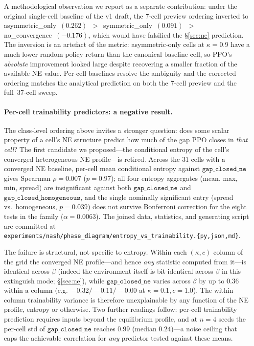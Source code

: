 \documentclass{anvil-paper}
\begin{document}
A methodological observation we report as a separate contribution:
under the original single-cell baseline of the v1 draft, the 7-cell
preview ordering inverted to
\textsf{asymmetric\_only}~$(0.262)$~$>$~\textsf{symmetric\_only}~$(0.091)$~$>$~%
\textsf{no\_convergence}~$(-0.176)$, which would have falsified the
\S\ref{sec:ne} prediction. The inversion is an artefact of the metric:
asymmetric-only cells at $\kappa{=}0.9$ have a much lower random-policy
return than the canonical baseline cell, so PPO's \emph{absolute}
improvement looked large despite recovering a smaller fraction of the
available NE value. Per-cell baselines resolve the ambiguity and the
corrected ordering matches the analytical prediction on both the 7-cell
preview and the full~$37$-cell sweep.

\paragraph{Per-cell trainability predictors: a negative result.}
The class-level ordering above invites a stronger question: does some
scalar property of a cell's NE structure predict how much of the gap PPO
closes in \emph{that cell}? The first candidate we proposed---the
conditional entropy of the cell's converged heterogeneous NE
profile---is retired. Across the $31$ cells with a converged NE
baseline, per-cell mean conditional entropy against
$\texttt{gap\_closed\_ne}$ gives Spearman $\rho{=}0.007$ ($p{=}0.97$);
all four entropy aggregates (mean, max, min, spread) are insignificant
against both $\texttt{gap\_closed\_ne}$ and
$\texttt{gap\_closed\_homogeneous}$, and the single nominally
significant entry (spread vs.\ homogeneous, $p{=}0.039$) does not
survive Bonferroni correction for the eight tests in the family
($\alpha{=}0.0063$). The joined data, statistics, and generating script
are committed at
\texttt{experiments/nash/phase\_diagram/entropy\_vs\_trainability.\{py,json,md\}}.

The failure is structural, not specific to entropy. Within each
$(\kappa,c)$ column of the grid the converged NE profile---and hence
\emph{any} statistic computed from it---is identical across $\beta$
(indeed the environment itself is bit-identical across $\beta$ in this
extinguish mode; \S\ref{sec:ne}), while
$\texttt{gap\_closed\_ne}$ varies across $\beta$ by up to $0.36$ within
a column (e.g.\ $-0.32/-0.11/-0.00$ at $\kappa{=}0.1,c{=}1.0$). The
within-column trainability variance is therefore unexplainable by any
function of the NE profile, entropy or otherwise. Two further readings
follow: per-cell trainability prediction requires inputs beyond the
equilibrium profile, and at $n{=}4$ seeds the per-cell std of
$\texttt{gap\_closed\_ne}$ reaches $0.99$ (median $0.24$)---a noise
ceiling that caps the achievable correlation for \emph{any} predictor
tested against these means.
\end{document}
